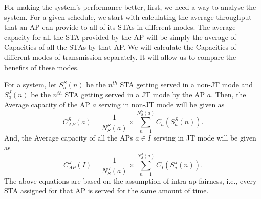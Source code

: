 


 
 
 
 

For making the system's performance better, first, we need a way to analyse the system.
For a given schedule, we start with calculating the average throughput that an AP can provide to all of its STAs in different modes.
The average capacity for all the STA provided by the AP will be simply the average of Capacities of all the STAs by that AP.
We will calculate the Capacities of different modes of transmission separately. It will allow us to compare the benefits of these modes.

For a system, let $S_a^S(n)$ be the $n^{th}$ STA getting served in a non-JT mode and $S_a^J(n)$ be the $n^{th}$ STA getting served in a JT mode by the AP $a$.
Then, the Average capacity of the AP $a$ serving in non-JT mode will be given as
\begin{equation}
    C_{AP}^S(a) = \frac{1}{N_S^S(a)} \times \sum_{n=1}^{N_S^S(a)} C_a(S_a^S(n)).
\end{equation}
And, the Average capacity of all the APs $a \in I$ serving in JT mode will be given as
\begin{equation}
    C_{AP}^J(I) = \frac{1}{N_S^J(a)} \times \sum_{n=1}^{N_S^J(a)} C_I(S_a^J(n)).
\end{equation}
The above equations are based on the assumption of intra-ap fairness, i.e., every STA assigned for that AP is served for the same amount of time.

